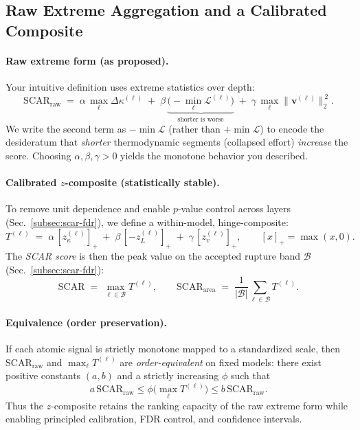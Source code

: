 \documentclass[11pt]{article}
\begin{document}
\vspace{0.6em}
\subsection{Raw Extreme Aggregation and a Calibrated Composite}
\label{subsec:scar-definitions}

\paragraph{Raw extreme form (as proposed).}
Your intuitive definition uses extreme statistics over depth:
\[
\label{eq:scar-score-raw}
\mathrm{SCAR}_{\mathrm{raw}}
\;=\;
\alpha\,\max_\ell \Delta\kappa^{(\ell)}
\;+\;
\beta\,\underbrace{\big(-\min_\ell \mathcal{L}^{(\ell)}\big)}_{\text{shorter is worse}}
\;+\;
\gamma\,\max_{\ell}\|\mathbf{v}^{(\ell)}\|_2^{\,2}.
\]
We write the second term as $-\min \mathcal{L}$ (rather than $+\min\mathcal{L}$) to encode the desideratum that \emph{shorter} thermodynamic segments (collapsed effort) \emph{increase} the score. Choosing $\alpha,\beta,\gamma>0$ yields the monotone behavior you described.

\paragraph{Calibrated $z$-composite (statistically stable).}
To remove unit dependence and enable $p$-value control across layers (Sec.~\ref{subsec:scar-fdr}), we define a within-model, hinge-composite:
\[
\label{eq:scar-score-composite}
T^{(\ell)} \;=\; \alpha\,[z_\kappa^{(\ell)}]_+ \;+\; \beta\,[-z_L^{(\ell)}]_+ \;+\; \gamma\,[z_v^{(\ell)}]_+,
\qquad [x]_+=\max(x,0).
\]
The \emph{SCAR score} is then the peak value on the accepted rupture band $\mathcal{B}$ (Sec.~\ref{subsec:scar-fdr}):
\[
\label{eq:scar-score-band}
\mathrm{SCAR}
\;=\;
\max_{\ell\in\mathcal{B}}T^{(\ell)},
\qquad
\mathrm{SCAR}_{\mathrm{area}}
\;=\;
\frac{1}{|\mathcal{B}|}\sum_{\ell\in\mathcal{B}} T^{(\ell)}.
\]

\paragraph{Equivalence (order preservation).}
If each atomic signal is strictly monotone mapped to a standardized scale, then $\mathrm{SCAR}_{\mathrm{raw}}$ and $\max_\ell T^{(\ell)}$ are \emph{order-equivalent} on fixed models: there exist positive constants $(a,b)$ and a strictly increasing $\phi$ such that
\[
a\,\mathrm{SCAR}_{\mathrm{raw}} \le \phi\!\big(\max_\ell T^{(\ell)}\big) \le b\,\mathrm{SCAR}_{\mathrm{raw}}.
\]
Thus the $z$-composite retains the ranking capacity of the raw extreme form while enabling principled calibration, FDR control, and confidence intervals.
\end{document}
